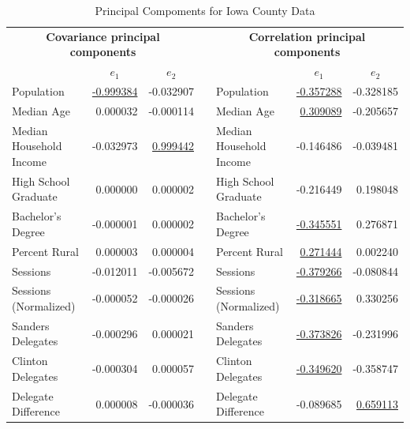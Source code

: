 \documentclass[11pt]{article}
\begin{document}
\begin{table}[H]
\centering
\caption{Principal Compoments for Iowa County Data}
\begin{tabular}{lrrllrr}
\multicolumn{3}{c}{\textbf{Covariance principal components}} &  & \multicolumn{3}{c}{\textbf{Correlation principal components}} \\
\cmidrule(r){1-3} \cmidrule(r){5-7}
 & \multicolumn{1}{c}{\textbf{$e_1$}} & \multicolumn{1}{c}{\textbf{$e_2$}} &  &  & \multicolumn{1}{c}{\textbf{$e_1$}} & \multicolumn{1}{c}{\textbf{$e_2$}} \\
\midrule
Population & \underline{-0.999384} & -0.032907 &  & Population & \underline{-0.357288} & -0.328185 \\
Median Age & 0.000032 & -0.000114 &  & Median Age & \underline{0.309089} & -0.205657 \\
Median Household Income & -0.032973 & \underline{0.999442} &  & Median Household Income & -0.146486 & -0.039481 \\
High School Graduate & 0.000000 & 0.000002 &  & High School Graduate & -0.216449 & 0.198048 \\
Bachelor's Degree & -0.000001 & 0.000002 &  & Bachelor's Degree & \underline{-0.345551} & 0.276871 \\
Percent Rural & 0.000003 & 0.000004 &  & Percent Rural & \underline{0.271444} & 0.002240 \\
Sessions & -0.012011 & -0.005672 &  & Sessions & \underline{-0.379266} & -0.080844 \\
Sessions (Normalized) & -0.000052 & -0.000026 &  & Sessions (Normalized) & \underline{-0.318665} & 0.330256 \\
Sanders Delegates & -0.000296 & 0.000021 &  & Sanders Delegates & \underline{-0.373826} & -0.231996 \\
Clinton Delegates & -0.000304 & 0.000057 &  & Clinton Delegates & \underline{-0.349620} & -0.358747 \\
Delegate Difference & 0.000008 & -0.000036 &  & Delegate Difference & -0.089685 & \underline{0.659113}
\end{tabular}
\end{table}

\begin{multicols}{2}

\end{multicols}
\end{document}
